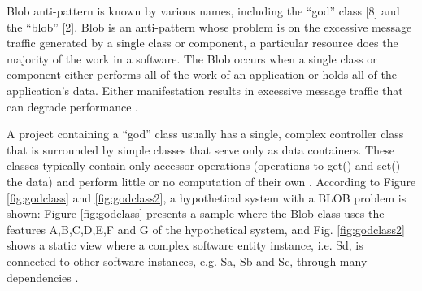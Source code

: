\documentclass[espaco=umemeio,chapter=TITLE,twoside,openright]{abnt}
\begin{document}
Blob anti-pattern is known by various names, including the “god” class [8] and the “blob” [2]. Blob is an anti-pattern whose problem is on the excessive message traffic generated by a single class or component, a particular resource does the majority of the work in a software. The Blob occurs when a single class or component either performs all of the work of an application or holds all of the application’s data. Either manifestation results in excessive message traffic that can degrade performance \cite{Cortellessa2007} \cite{Smith2000}.

A project containing a “god” class usually has a single, complex controller class that is surrounded by simple classes that serve only as data containers. These classes typically contain only accessor operations (operations to get() and set() the data) and perform little or no computation of their own \cite{Smith2000}. According to Figure \ref{fig:godclass} and \ref{fig:godclass2}, a hypothetical system with a BLOB problem is shown: Figure \ref{fig:godclass} presents a sample where the Blob class uses the features A,B,C,D,E,F and G of the hypothetical system, and Fig. \ref{fig:godclass2} shows a static view where a complex software entity instance, i.e. Sd, is connected to other software instances, e.g. Sa, Sb and Sc, through many dependencies \cite{Vetoio2011}\cite{Wert2013a}.
\end{document}
